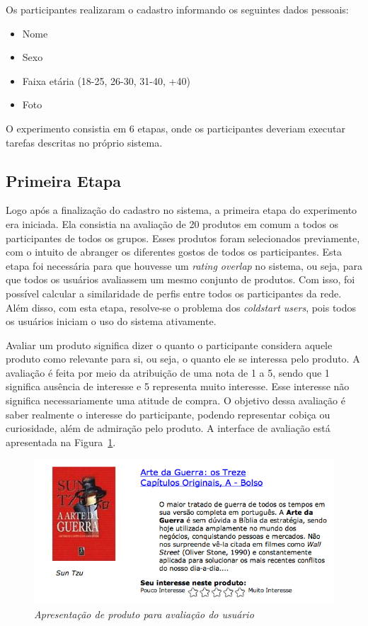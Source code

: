 Os participantes realizaram o cadastro informando os seguintes dados pessoais:

\begin{itemize}
  \item Nome
  \item Sexo
  \item Faixa etária (18-25, 26-30, 31-40, +40)
  \item Foto
\end{itemize}

O experimento consistia em 6 etapas, onde os participantes deveriam executar tarefas descritas no próprio sistema.

\subsection{Primeira Etapa}
\label{cha:primeira_etapa}

Logo após a finalização do cadastro no sistema, a primeira etapa do experimento era iniciada. Ela consistia na avaliação de 20 produtos em comum a todos os participantes de todos os grupos. Esses produtos foram selecionados previamente, com o intuito de abranger os diferentes gostos de todos os participantes. Esta etapa foi necessária para que houvesse um \textit{rating overlap} no sistema, ou seja, para que todos os usuários avaliassem um mesmo conjunto de produtos. Com isso, foi possível calcular a similaridade de perfis entre todos os participantes da rede. Além disso, com esta etapa, resolve-se o problema dos \textit{coldstart users}, pois todos os usuários iniciam o uso do sistema ativamente.

Avaliar um produto significa dizer o quanto o participante considera aquele produto como relevante para si, ou seja, o quanto ele se interessa pelo produto. A avaliação é feita por meio da atribuição de uma nota de 1 a 5, sendo que 1 significa ausência de interesse e 5 representa muito interesse. Esse interesse não significa necessariamente uma atitude de compra. O objetivo dessa avaliação é saber realmente o interesse do participante, podendo representar cobiça ou curiosidade, além de admiração pelo produto. A interface de avaliação está apresentada na Figura~\ref{fig:product-rating}.

\begin{figure}[htp]
  \centering
  \includegraphics[width=\textwidth]{imagens/product-rating}
  \caption{\it Apresentação de produto para avaliação do usuário}
  \label{fig:product-rating}
\end{figure}


